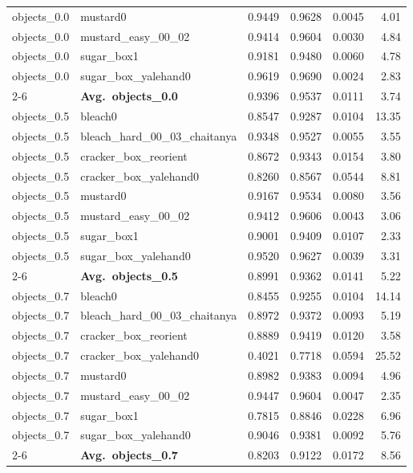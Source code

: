 \begin{longtable}{llrrrr}
  objects_0.0 & mustard0 & 0.9449 & 0.9628 & 0.0045 & 4.01 \\
  objects_0.0 & mustard\_easy\_00\_02 & 0.9414 & 0.9604 & 0.0030 & 4.84 \\
  objects_0.0 & sugar\_box1 & 0.9181 & 0.9480 & 0.0060 & 4.78 \\
  objects_0.0 & sugar\_box\_yalehand0 & 0.9619 & 0.9690 & 0.0024 & 2.83 \\
  \cmidrule{2-6}
  & \textbf{Avg.~objects_0.0} & 0.9396 & 0.9537 & 0.0111 & 3.74 \\
  \midrule
  objects_0.5 & bleach0 & 0.8547 & 0.9287 & 0.0104 & 13.35 \\
  objects_0.5 & bleach\_hard\_00\_03\_chaitanya & 0.9348 & 0.9527 & 0.0055 & 3.55 \\
  objects_0.5 & cracker\_box\_reorient & 0.8672 & 0.9343 & 0.0154 & 3.80 \\
  objects_0.5 & cracker\_box\_yalehand0 & 0.8260 & 0.8567 & 0.0544 & 8.81 \\
  objects_0.5 & mustard0 & 0.9167 & 0.9534 & 0.0080 & 3.56 \\
  objects_0.5 & mustard\_easy\_00\_02 & 0.9412 & 0.9606 & 0.0043 & 3.06 \\
  objects_0.5 & sugar\_box1 & 0.9001 & 0.9409 & 0.0107 & 2.33 \\
  objects_0.5 & sugar\_box\_yalehand0 & 0.9520 & 0.9627 & 0.0039 & 3.31 \\
  \cmidrule{2-6}
  & \textbf{Avg.~objects_0.5} & 0.8991 & 0.9362 & 0.0141 & 5.22 \\
  \midrule
  objects_0.7 & bleach0 & 0.8455 & 0.9255 & 0.0104 & 14.14 \\
  objects_0.7 & bleach\_hard\_00\_03\_chaitanya & 0.8972 & 0.9372 & 0.0093 & 5.19 \\
  objects_0.7 & cracker\_box\_reorient & 0.8889 & 0.9419 & 0.0120 & 3.58 \\
  objects_0.7 & cracker\_box\_yalehand0 & 0.4021 & 0.7718 & 0.0594 & 25.52 \\
  objects_0.7 & mustard0 & 0.8982 & 0.9383 & 0.0094 & 4.96 \\
  objects_0.7 & mustard\_easy\_00\_02 & 0.9447 & 0.9604 & 0.0047 & 2.35 \\
  objects_0.7 & sugar\_box1 & 0.7815 & 0.8846 & 0.0228 & 6.96 \\
  objects_0.7 & sugar\_box\_yalehand0 & 0.9046 & 0.9381 & 0.0092 & 5.76 \\
  \cmidrule{2-6}
  & \textbf{Avg.~objects_0.7} & 0.8203 & 0.9122 & 0.0172 & 8.56 \\

\end{longtable}

